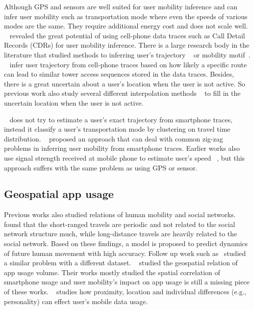 Although GPS and sensors are well suited for user mobility inference and can infer user mobility such as transportation mode where even the speeds of various modes are the same. They require additional energy cost and does not scale well. ~\cite{rose2006mobile} revealed the great potential of using cell-phone data traces such as Call Detail Records (CDRs) for user mobility inference. There is a large research body in the literature that studied methods to inferring user's trajectory ~\cite{smoreda2013spatiotemporal, hoteit2014estimating, widhalm2015discovering, Alsolami2012Auth, jiang2013review, doyle2011utilising, bekhor2015investigation} or mobility motif~\cite{wang2014mobile, gambs2012next}. ~\cite{Alsolami2012Auth, jiang2013review, doyle2011utilising} infer user trajectory from cell-phone traces based on how likely a specific route can lead to similar tower access sequences stored in the data traces.  Besides, there is a great uncertain about a user's location when the user is not active. So previous work also study several different interpolation methods ~\cite{hoteit2014estimating, ficek2012inter} to fill in the uncertain location when the user is not active. 

~\cite{wang2010transportation} does not try to estimate a user's exact trajectory from smartphone traces, instead it classify a user's transportation mode by clustering on travel time distribution. ~\cite{} proposed an approach that can deal with common zig-zag problems in inferring user mobility from smartphone traces. Earlier works also use signal strength received at mobile phone to estimate user's speed ~\cite{sohn2006mobility}, but this approach suffers with the same problem as using GPS or sensor.

\subsection{Geospatial app usage}
Previous works also studied relations of human mobility and social networks. ~\cite{cho2011friendship} found that the short-ranged travels are periodic and not related to the social network structure much, while long-distance travels are heavily related to the social network. Based on these findings, a model is proposed to predict dynamics of future human movement with high accuracy. Follow up work such as~\cite{Noulas11} studied a similar problem with a different dataset. ~\cite{shafiq2012characterizing,yang2015characterizing} studied the geospatial relation of app usage volume. Their works mostly studied the spatial correlation of smartphone usage and user mobility's impact on app usage is still a missing piece of these works. ~\cite{meng2014analyzing} studies how proximity, location and individual differences (e.g., personality) can effect user's mobile data usage.

